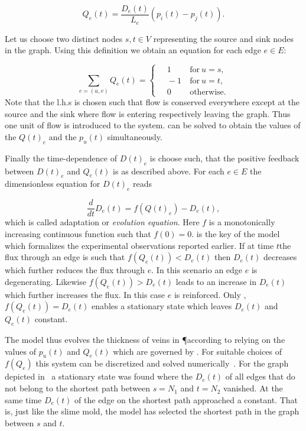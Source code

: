 			\begin{equation}
				Q_e(t) = \frac{D_e(t)}{L_e} (p_i(t) - p_j(t)).
				\label{eq:flow}
			\end{equation}

			Let us choose two distinct nodes $s, t \in V$ representing the source and sink nodes in the graph. Using this definition we obtain an equation for each edge $e \in E$:

			\begin{equation}
				\sum_{e = (u,v) } Q_e(t) =
				\begin{cases}
				\quad 1 & \ \text{for} \ u=s, \\
				\quad -1 & \ \text{for} \ u=t, \\
				\quad 0 & \ \text{otherwise}.
				\end{cases}
				\label{eq:conservation_of_flow}
			\end{equation}
			Note that the l.h.s is chosen such that flow is conserved everywhere except at the source and the sink where flow is entering respectively leaving the graph. Thus one unit of flow is introduced to the system.  can be solved to obtain the values of the $Q(t)_e$ and the $p_u(t)$ simultaneously.

			Finally the time-dependence of $D(t)_e$ is choose such, that the positive feedback between $D(t)_e$ and $Q_e(t)$ is as described above. For each $e \in E$ the dimensionless equation for $D(t)_e$ reads

			\begin{equation}
				\frac{d}{dt} D_e(t) = f( Q(t)_e ) - D_e(t),
				\label{eq:evolution}
			\end{equation}
			which is called adaptation or \emph{evolution equation}. Here $f$ is a monotonically increasing continuous function such that $f(0) = 0$.  is the key of the model which formalizes the experimental observations reported earlier. If at time $t$the flux through an edge is such that $f(Q_e(t)) < D_e(t)$ then $D_e(t)$ decreases which further reduces the flux through $e$. In this scenario an edge $e$ is degenerating. Likewise $f(Q_e(t)) > D_e(t)$ leads to an increase in $D_e(t)$ which further increases the flux. In this case $e$ is reinforced. Only ,$f(Q_e(t)) = D_e(t)$ enables a stationary state which leaves $D_e(t)$ and $Q_e(t)$ constant. 

			The model thus evolves the thickness of veins in \P according to  relying on the values of $p_u(t)$ and $Q_e(t)$ which are governed by . For suitable choices of $f(Q_e)$ this system can be discretized and solved numerically~\cite{Tero2006115}. For the graph depicted in~ a stationary state was found where the $D_e(t)$ of all edges that do not belong to the shortest path between $s=N_1$ and $t=N_2$ vanished. At the same time $D_e(t)$ of the edge on the shortest path approached a constant. That is, just like the slime mold, the model has selected the shortest path in the graph between $s$ and $t$. 

